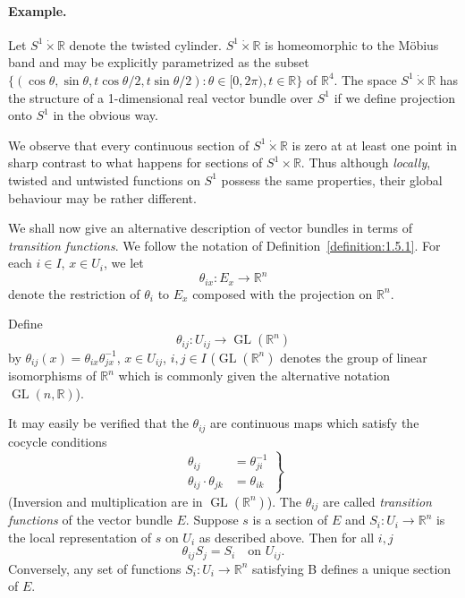 \paragraph*{Example.} Let $S^1\mathbin{\dot\times}\mathbb R$ denote the twisted cylinder. $S^1\mathbin{\dot\times}\mathbb R$ is homeomorphic to the M\"obius band and may be explicitly parametrized as the subset $\{(\cos\theta,\sin\theta,t\cos\theta/2,t\sin\theta/2):\theta\in[0,2\pi),t\in\mathbb R\}$ of $\mathbb R^4$. The space $S^1\mathbin{\dot\times}\mathbb R$ has the structure of a 1-dimensional real vector bundle over $S^1$ if we define projection onto $S^1$ in the obvious way.

\begin{center}
    \begin{minipage}{\linewidth}
        \centering
        
    \end{minipage}
\end{center}
We observe that every continuous section of $S^1\mathbin{\dot\times}\mathbb R$ is zero at at least one point in sharp contrast to what happens for sections of $S^1\times\mathbb R$. Thus although \emph{locally}, twisted and untwisted functions on $S^1$ possess the same properties, their global behaviour may be rather different.

We shall now give an alternative description of vector bundles in terms of \emph{transition functions}. We follow the notation of Definition~\ref{definition:1.5.1}. For each $i\in I$, $x\in U_i$, we let
\[ \theta_{ix}:E_x\longrightarrow\mathbb R^n \]
denote the restriction of $\theta_i$ to $E_x$ composed with the projection on $\mathbb R^n$.

Define
\[ \theta_{ij}:U_{ij}\longrightarrow\operatorname{GL}(\mathbb R^n) \]
by $\theta_{ij}(x)=\theta_{ix}\theta_{jx}^{-1}$, $x\in U_{ij}$, $i,j\in I$ ($\operatorname{GL}(\mathbb R^n)$ denotes the group of linear isomorphisms of $\mathbb R^n$ which is commonly given the alternative notation $\operatorname{GL}(n,\mathbb R)$).

It may easily be verified that the $\theta_{ij}$ are continuous maps which satisfy the cocycle conditions
\begin{equation}
\left.\begin{aligned}\theta_{ij}&=\theta_{ji}^{-1}\\ \theta_{ij}\cdot\theta_{jk}&=\theta_{ik}\end{aligned}\right\}\tag{A}\label{eq:1:a:2}
\end{equation}
(Inversion and multiplication are in $\operatorname{GL}(\mathbb R^n)$). The $\theta_{ij}$ are called \emph{transition functions} of the vector bundle $E$. Suppose $s$ is a section of $E$ and $S_i:U_i\to\mathbb R^n$ is the local representation of $s$ on $U_i$ as described above. Then for all $i,j$
\begin{equation} \theta_{ij}S_j=S_i\quad\text{on }U_{ij}.\tag{B}\label{eq:1:b:1}\end{equation}
Conversely, any set of functions $S_i:U_i\to\mathbb R^n$ satisfying B defines a unique section of $E$.

